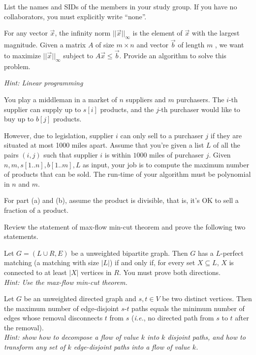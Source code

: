 \documentclass{article}
\begin{document}
List the names and SIDs of the members in your study group.
If you have no collaborators, you must explicitly write ``none''.


For any vector $\vec{x}$, the infinity norm  $|| \vec{x} ||_{\infty}$ is the element of $\vec{x}$ with the largest magnitude. Given a matrix $A$  of size $m\times n$ and vector $\vec{b}$ of length $m$ , we want to maximize $|| \vec{x} ||_{\infty}$ subject to $A\vec{x} \leq \vec{b}$. Provide an algorithm to solve this problem.

\textit{Hint: Linear programming}



You play a middleman in a market of $n$ suppliers
and  $m$ purchasers.
The $i$-th supplier can supply up to $s[i]$ products,
and the $j$-th purchaser would like to buy up to $b[j]$ products.

However, due to legislation, supplier $i$ can only sell  to a purchaser $j$ if they
are situated at most 1000 miles apart.
Assume that you're given a list $L$ of all the pairs $(i,j)$ such that
supplier $i$ is within $1000$ miles of purchaser $j$.
 Given $n,m,s[1..n],b[1..m],L$ as input,
your job is to compute the maximum number of products that can be
sold.
The run-time of your algorithm must be polynomial in $n$ and $m$.

For part (a) and (b), assume the product is divisible, that is, it's OK to sell a fraction of a product.



Review the statement of max-flow min-cut theorem and prove the following two statements.
\begin{subparts}
 \subpart
Let $G = (L \cup R,E)$ be a unweighted bipartite graph. Then $G$ has a $L$-perfect
matching (a matching with size $|L|$) if and only if, for every set $X \subseteq L$, $X$ is connected to at least $|X|$ vertices
in $R$. You must prove both directions. \\ \textit{Hint: Use the max-flow min-cut theorem.}

\subpart
Let $G$ be an unweighted directed graph and $s,t \in V$ be two distinct vertices. Then the maximum number of
edge-disjoint $s$-$t$ paths equals the minimum number of edges whose removal disconnects $t$ from
$s$ (\textit{i.e.}, no directed path from $s$ to $t$ after the removal).
\\ \textit{Hint: show how to decompose a flow of value $k$  into $k$ disjoint paths, and how to
transform any set of  $k$ edge-disjoint paths into a flow of value $k$.}
\end{subparts}
\end{document}
